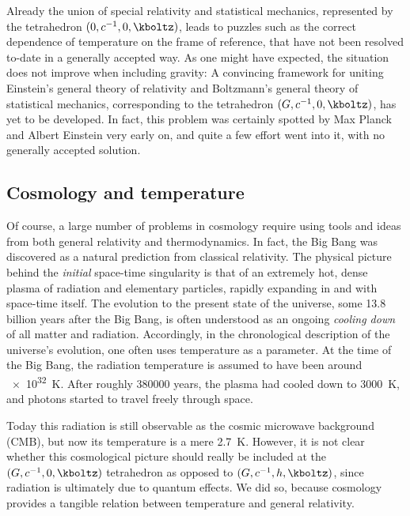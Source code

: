 
\newpage {}
\label{sec:1101}

Already the union of special relativity and statistical mechanics, represented by the tetrahedron $(0,c^{-1},0,\kboltz)$, leads to puzzles such as the correct dependence of temperature on the frame of reference, that have not been resolved to-date in a generally accepted way. As one might have expected, the situation does not improve when including gravity: A convincing framework for uniting Einstein's general theory of relativity and Boltzmann's general theory of statistical mechanics, corresponding to the tetrahedron $(G,c^{-1},0,\kboltz)$, has yet to be developed. In fact, this problem was certainly spotted by Max Planck and Albert Einstein very early on, and quite a few effort went into it, with no generally accepted solution.


\subsection*{Cosmology and temperature}

Of course, a large number of problems in cosmology require using tools and ideas from both general relativity and thermodynamics. In fact, the Big Bang was discovered as a natural prediction from classical relativity. The physical picture behind the \emph{initial} space-time singularity is that of an extremely hot, dense plasma of radiation and elementary particles, rapidly expanding in and with space-time itself. The evolution to the present state of the universe, some \num{13.8} billion years after the Big Bang, is often understood as an ongoing \emph{cooling down} of all matter and radiation. Accordingly, in the chronological description of the universe's evolution, one often uses temperature as a parameter. At the time of the Big Bang, the radiation temperature is assumed to have been around \qty{e32}{\kelvin}. After roughly \num{380000} years, the plasma had cooled down to \qty{3000}{\kelvin}, and photons started to travel freely through space.

Today this radiation is still observable as the cosmic microwave background (CMB), but now its temperature is a mere \qty{2.7}{\kelvin}. However, it is not clear whether this cosmological picture should really be included at the $(G,c^{-1},0,\kboltz)$ tetrahedron as opposed to $(G,c^{-1},h,\kboltz)$, since radiation is ultimately due to quantum effects. We did so, because cosmology provides a tangible relation between temperature and general relativity.


